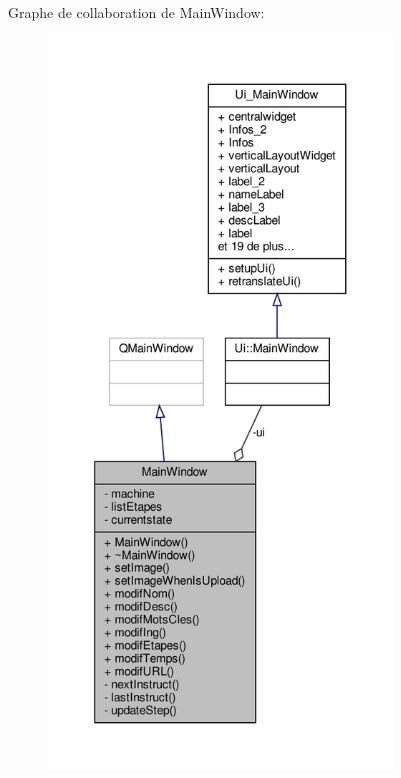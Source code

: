Graphe de collaboration de Main\+Window\+:\nopagebreak
\begin{figure}[H]
\begin{center}
\leavevmode
\includegraphics[height=550pt]{classMainWindow__coll__graph}
\end{center}
\end{figure}
